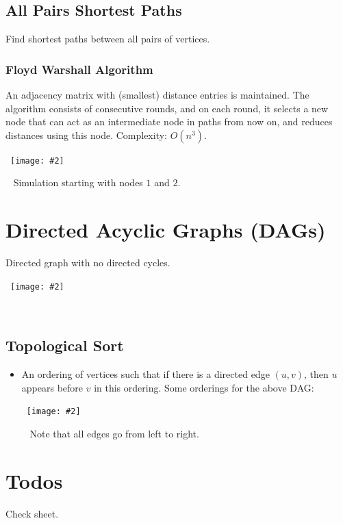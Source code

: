 \documentclass{article}
\newcommand{\image}[2]{\
    \begin{center}\
        \texttt{[image: \#2]}\
    \end{center}\
}
\begin{document}
\begin{sloppypar}
    \subsection{All Pairs Shortest Paths}
    Find shortest paths between all pairs of vertices.
    \subsubsection{Floyd Warshall Algorithm}
    An adjacency matrix with (smallest) distance entries is maintained. The algorithm consists of consecutive rounds, and on each round, it selects a new node that can act as an intermediate node in paths from now on, and reduces distances using this node. Complexity: $O(n^3)$.
    \image{0.8}{../images/floyd-warshall.png}
    Simulation starting with nodes $1$ and $2$.

    \newpage

    \section{Directed Acyclic Graphs (DAGs)}
    
    Directed graph with no directed cycles.
    \image{0.3}{../images/dag.png}

    \subsection{Topological Sort}
    \begin{itemize}
        \item An ordering of vertices such that if there is a directed edge $(u,v)$, then $u$ appears before $v$ in this ordering. Some orderings for the above DAG:
        \image{0.6}{../images/topsorts.png}
        Note that all edges go from left to right.
    \end{itemize}

    \section{Todos}
    Check sheet.

\end{sloppypar}
\end{document}

